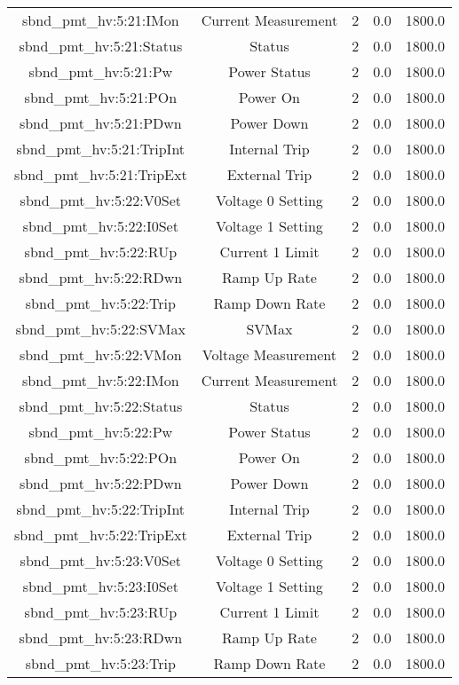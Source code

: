 \begin{center}
\begin{longtable}{c | c c c c }
sbnd\_pmt\_hv:5:21:IMon & Current Measurement & 2 & 0.0 & 1800.0\\ 
sbnd\_pmt\_hv:5:21:Status & Status & 2 & 0.0 & 1800.0\\ 
sbnd\_pmt\_hv:5:21:Pw & Power Status & 2 & 0.0 & 1800.0\\ 
sbnd\_pmt\_hv:5:21:POn & Power On & 2 & 0.0 & 1800.0\\ 
sbnd\_pmt\_hv:5:21:PDwn & Power Down & 2 & 0.0 & 1800.0\\ 
sbnd\_pmt\_hv:5:21:TripInt & Internal Trip & 2 & 0.0 & 1800.0\\ 
sbnd\_pmt\_hv:5:21:TripExt & External Trip & 2 & 0.0 & 1800.0\\ 
sbnd\_pmt\_hv:5:22:V0Set & Voltage 0 Setting & 2 & 0.0 & 1800.0\\ 
sbnd\_pmt\_hv:5:22:I0Set & Voltage 1 Setting & 2 & 0.0 & 1800.0\\ 
sbnd\_pmt\_hv:5:22:RUp & Current 1 Limit & 2 & 0.0 & 1800.0\\ 
sbnd\_pmt\_hv:5:22:RDwn & Ramp Up Rate & 2 & 0.0 & 1800.0\\ 
sbnd\_pmt\_hv:5:22:Trip & Ramp Down Rate & 2 & 0.0 & 1800.0\\ 
sbnd\_pmt\_hv:5:22:SVMax & SVMax & 2 & 0.0 & 1800.0\\ 
sbnd\_pmt\_hv:5:22:VMon & Voltage Measurement & 2 & 0.0 & 1800.0\\ 
sbnd\_pmt\_hv:5:22:IMon & Current Measurement & 2 & 0.0 & 1800.0\\ 
sbnd\_pmt\_hv:5:22:Status & Status & 2 & 0.0 & 1800.0\\ 
sbnd\_pmt\_hv:5:22:Pw & Power Status & 2 & 0.0 & 1800.0\\ 
sbnd\_pmt\_hv:5:22:POn & Power On & 2 & 0.0 & 1800.0\\ 
sbnd\_pmt\_hv:5:22:PDwn & Power Down & 2 & 0.0 & 1800.0\\ 
sbnd\_pmt\_hv:5:22:TripInt & Internal Trip & 2 & 0.0 & 1800.0\\ 
sbnd\_pmt\_hv:5:22:TripExt & External Trip & 2 & 0.0 & 1800.0\\ 
sbnd\_pmt\_hv:5:23:V0Set & Voltage 0 Setting & 2 & 0.0 & 1800.0\\ 
sbnd\_pmt\_hv:5:23:I0Set & Voltage 1 Setting & 2 & 0.0 & 1800.0\\ 
sbnd\_pmt\_hv:5:23:RUp & Current 1 Limit & 2 & 0.0 & 1800.0\\ 
sbnd\_pmt\_hv:5:23:RDwn & Ramp Up Rate & 2 & 0.0 & 1800.0\\ 
sbnd\_pmt\_hv:5:23:Trip & Ramp Down Rate & 2 & 0.0 & 1800.0\\ 

\end{longtable}
\end{center}

